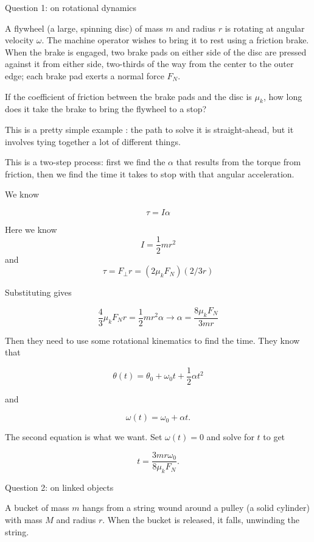 \documentclass[12pt]{article}
\begin{document}
\Large
\centerline{}
\normalsize



\centerline{\large Question 1: on rotational dynamics}
A flywheel (a large, spinning disc) of mass $m$ and radius $r$ is rotating
at angular velocity $\omega$. The machine operator wishes to bring it to rest using a friction brake. When the brake
is engaged, two brake pads on either side of the disc are pressed against it from either side, two-thirds
of the way from the center to the outer edge; each brake pad
exerts a normal force $F_N$.

If the coefficient of friction between the brake pads and the disc is $\mu_k$, how long does it take the
brake to bring the flywheel to a stop?

{\color{red}

This is a pretty simple example : the path to solve it is straight-ahead, but it involves tying together a lot of different things.

This is a two-step process: first we find the $\alpha$ that results from the torque from friction, then we find the time it takes to stop with that angular acceleration.

We know 

$$\tau = I \alpha$$

Here we know $$I=\frac{1}{2}mr^2$$ and $$\tau = F_\perp r = (2 \mu_k F_N)(2/3 r)$$

Substituting gives

$$\frac{4}{3} \mu_k F_N r = \frac{1}{2}mr^2 \alpha \rightarrow \alpha = \frac{8\mu_k F_N}{3mr}$$

Then they need to use some rotational kinematics  to find the time. They know that
	
	$$\theta(t) = \theta_0 + \omega_0 t + \frac{1}{2}\alpha t^2$$
	
	and
	
	$$\omega(t) = \omega_0 + \alpha t.$$
	
The second equation is what we want. Set $\omega(t)=0$ and solve for $t$ to get

$$t = \frac{3mr\omega_0}{8\mu_k F_N}.$$

}
	
	
	

\newpage
\centerline{\large Question 2: on linked objects}

A bucket of mass $m$ hangs from a string wound around a pulley
(a solid cylinder) with mass $M$ and radius $r$. When the bucket is
released, it falls, unwinding the string.
\end{document}

